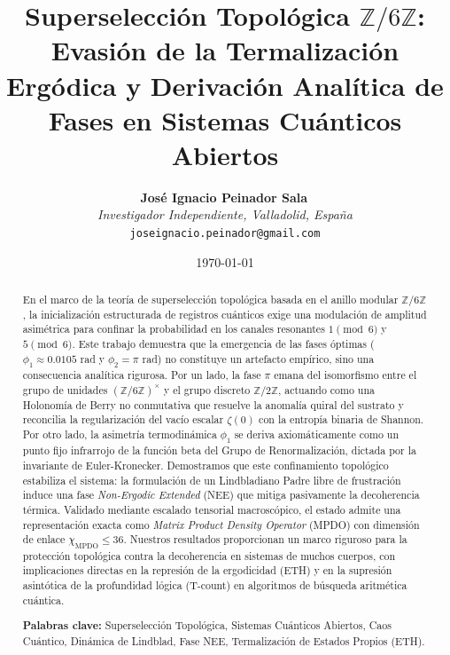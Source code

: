 \documentclass[12pt,a4paper]{article}
\theoremstyle{plain}
\theoremstyle{definition}
\theoremstyle{remark}
\begin{document}
\title{Superselección Topológica $\mathbb{Z}/6\mathbb{Z}$: Evasión de la Termalización Ergódica y Derivación Analítica de Fases en Sistemas Cuánticos Abiertos}

\author{
  \textbf{José Ignacio Peinador Sala}\, \\
  \textit{Investigador Independiente, Valladolid, España} \\
  \texttt{joseignacio.peinador@gmail.com}
}

\date{\today}
\maketitle

\begin{abstract}
En el marco de la teoría de superselección topológica basada en el anillo modular $\mathbb{Z}/6\mathbb{Z}$, la inicialización estructurada de registros cuánticos exige una modulación de amplitud asimétrica para confinar la probabilidad en los canales resonantes $1 \pmod 6$ y $5 \pmod 6$. Este trabajo demuestra que la emergencia de las fases óptimas ($\phi_1 \approx 0.0105$ rad y $\phi_2 = \pi$ rad) no constituye un artefacto empírico, sino una consecuencia analítica rigurosa. Por un lado, la fase $\pi$ emana del isomorfismo entre el grupo de unidades $(\mathbb{Z}/6\mathbb{Z})^{\times}$ y el grupo discreto $\mathbb{Z}/2\mathbb{Z}$, actuando como una Holonomía de Berry no conmutativa que resuelve la anomalía quiral del sustrato y reconcilia la regularización del vacío escalar $\zeta(0)$ con la entropía binaria de Shannon. Por otro lado, la asimetría termodinámica $\phi_1$ se deriva axiomáticamente como un punto fijo infrarrojo de la función beta del Grupo de Renormalización, dictada por la invariante de Euler-Kronecker. Demostramos que este confinamiento topológico estabiliza el sistema: la formulación de un Lindbladiano Padre libre de frustración induce una fase \textit{Non-Ergodic Extended} (NEE) que mitiga pasivamente la decoherencia térmica. Validado mediante escalado tensorial macroscópico, el estado admite una representación exacta como \textit{Matrix Product Density Operator} (MPDO) con dimensión de enlace $\chi_{\text{MPDO}} \le 36$. Nuestros resultados proporcionan un marco riguroso para la protección topológica contra la decoherencia en sistemas de muchos cuerpos, con implicaciones directas en la represión de la ergodicidad (ETH) y en la supresión asintótica de la profundidad lógica (T-count) en algoritmos de búsqueda aritmética cuántica.

\vspace{0.5cm}
\noindent \textbf{Palabras clave:} Superselección Topológica, Sistemas Cuánticos Abiertos, Caos Cuántico, Dinámica de Lindblad, Fase NEE, Termalización de Estados Propios (ETH).

\end{abstract}
\end{document}
